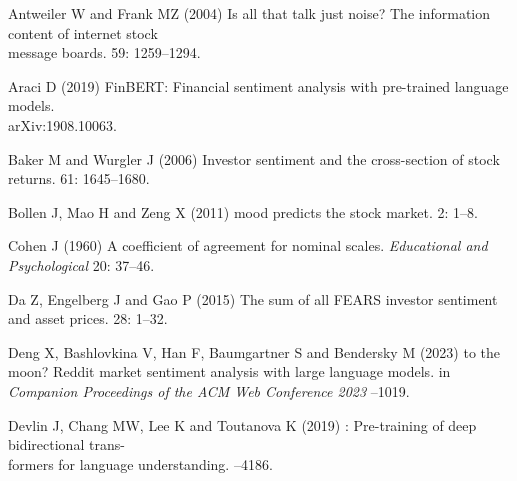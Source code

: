 \documentclass{aims}
\numberwithin{equation}{section}
\begin{document}
\providecommand{\href}[2]{#2}
\providecommand{\arxiv}[1]{\href{http://arxiv.org/abs/#1}{arXiv:#1}}
\providecommand{\url}[1]{\texttt{#1}}
\providecommand{\urlprefix}{URL }

\begin{thebibliography}{}

\newblock Antweiler W and Frank MZ (2004)
\newblock Is all that talk just noise? The information content of internet stock\\ 
message boards.
 59: 1259--1294. 

\newblock Araci D (2019)
\newblock FinBERT: Financial sentiment analysis with pre-trained language models.\\
\newblock arXiv:1908.10063. 

\newblock Baker M and Wurgler J (2006)
\newblock Investor sentiment and the cross-section of stock returns.
 61: 1645--1680. 

\newblock Bollen J, Mao H and Zeng X (2011)
 mood predicts the stock market.
 2: 1--8. 

\newblock Cohen J (1960)
\newblock A coefficient of agreement for nominal scales. {\em Educational and Psychological}
 20: 37--46. 
  
\newblock Da Z, Engelberg J and Gao P (2015)
\newblock The sum of all {FEARS} investor sentiment and asset prices.
 28: 1--32. 
  
\newblock Deng X, Bashlovkina V, Han F, Baumgartner S and Bendersky M (2023)
 to the moon? {Reddit} market sentiment analysis with large
  language models.
\newblock in {\em Companion Proceedings of the ACM Web Conference 2023}
--1019. 

\newblock Devlin J, Chang MW, Lee K and Toutanova K (2019)
: Pre-training of deep bidirectional trans-\\
formers for language understanding.
--4186. 


\end{thebibliography}
\end{document}
